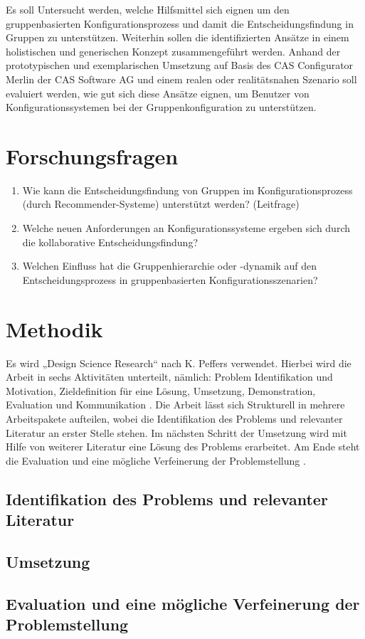 \documentclass{article}
\begin{document}
Es soll Untersucht werden, welche Hilfsmittel sich eignen um den gruppenbasierten Konfigurationsprozess und damit die Entscheidungsfindung in Gruppen zu unterstützen. Weiterhin sollen die identifizierten Ansätze in einem holistischen und generischen Konzept zusammengeführt werden. Anhand der prototypischen und exemplarischen Umsetzung auf Basis des CAS Configurator Merlin der CAS Software AG und einem realen oder realitätsnahen Szenario soll evaluiert werden, wie gut sich diese Ansätze eignen, um Benutzer von Konfigurationssystemen bei der Gruppenkonfiguration zu unterstützen. 

\section{Forschungsfragen}

\begin{enumerate}
    \item Wie kann die Entscheidungsfindung von Gruppen im Konfigurationsprozess (durch Recommender-Systeme) unterstützt werden? (Leitfrage)
    \item Welche neuen Anforderungen an Konfigurationssysteme ergeben sich durch die kollaborative Entscheidungsfindung?
    \item Welchen Einfluss hat die Gruppenhierarchie oder -dynamik auf den Entscheidungsprozess in gruppenbasierten Konfigurationsszenarien?
\end{enumerate}

\section{Methodik}

Es wird „Design Science Research“ nach K. Peffers verwendet. Hierbei wird die Arbeit in sechs Aktivitäten unterteilt, nämlich: Problem Identifikation und Motivation, Zieldefinition für eine Lösung, Umsetzung, Demonstration, Evaluation und  Kommunikation \cite{peffersDesignScienceResearch2007}. Die Arbeit lässt sich Strukturell in mehrere Arbeitspakete aufteilen, wobei die Identifikation des Problems und relevanter Literatur an erster Stelle stehen. Im nächsten Schritt der Umsetzung wird mit Hilfe von weiterer Literatur eine Lösung des Problems erarbeitet. Am Ende steht die Evaluation und eine mögliche Verfeinerung der Problemstellung \cite{offermannOutlineDesignScience2009}.

\subsection{Identifikation des Problems und relevanter Literatur}

\subsection{Umsetzung}

\subsection{Evaluation und eine mögliche Verfeinerung der Problemstellung}

\printbibliography[heading=bibintoc]
\end{document}
